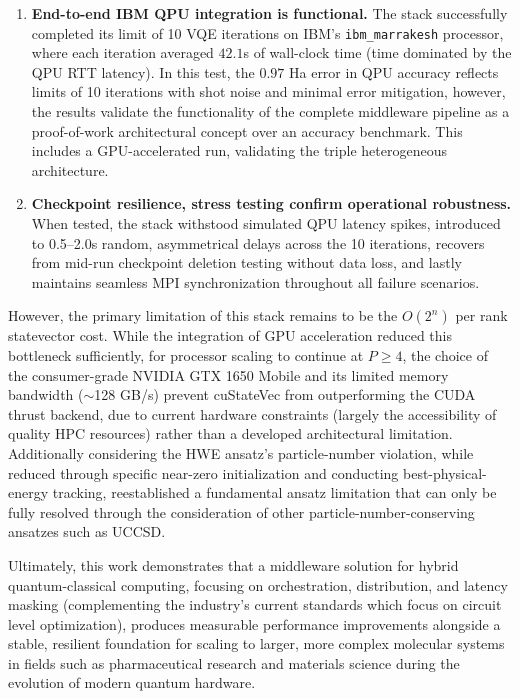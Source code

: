 \begin{enumerate}
    \item \textbf{End-to-end IBM QPU integration is functional.} The stack successfully completed its limit of 10 VQE iterations on IBM's \texttt{ibm\_marrakesh} processor, where each iteration averaged $42.1$s of wall-clock time (time dominated by the QPU RTT latency). In this test, the $0.97$ Ha error in QPU accuracy reflects limits of 10 iterations with shot noise and minimal error mitigation, however, the results validate the functionality of the complete middleware pipeline as a proof-of-work architectural concept over an accuracy benchmark. This includes a GPU-accelerated run, validating the triple heterogeneous architecture.

    \item \textbf{Checkpoint resilience, stress testing confirm operational robustness.} When tested, the stack  withstood simulated QPU latency spikes, introduced to 0.5--2.0s random, asymmetrical delays across the 10 iterations, recovers from mid-run checkpoint deletion testing without data loss, and lastly maintains seamless MPI synchronization throughout all failure scenarios.
\end{enumerate}

However, the primary limitation of this stack remains to be the $O(2^n)$ per rank statevector cost.
While the integration of GPU acceleration reduced this bottleneck sufficiently, for processor scaling to continue at 
$P \geq 4$, the choice of the consumer-grade NVIDIA GTX 1650 Mobile and its limited memory bandwidth ($\sim$128 GB/s) prevent cuStateVec from 
outperforming the CUDA thrust backend, due to current hardware constraints (largely the accessibility of quality HPC resources) rather than a developed architectural 
limitation. Additionally considering the HWE ansatz's particle-number violation, while reduced through specific near-zero initialization 
and conducting best-physical-energy tracking, reestablished a fundamental ansatz limitation that can only be fully resolved through the consideration of other 
particle-number-conserving ansatzes such as UCCSD.

Ultimately, this work demonstrates that a middleware solution for hybrid quantum-classical computing, focusing on 
orchestration, distribution, and latency masking (complementing the industry's current standards which focus on circuit level optimization), produces measurable 
performance improvements alongside a stable, resilient foundation for scaling to larger, more complex molecular systems in fields such as pharmaceutical research 
and materials science during the evolution of modern quantum hardware.

